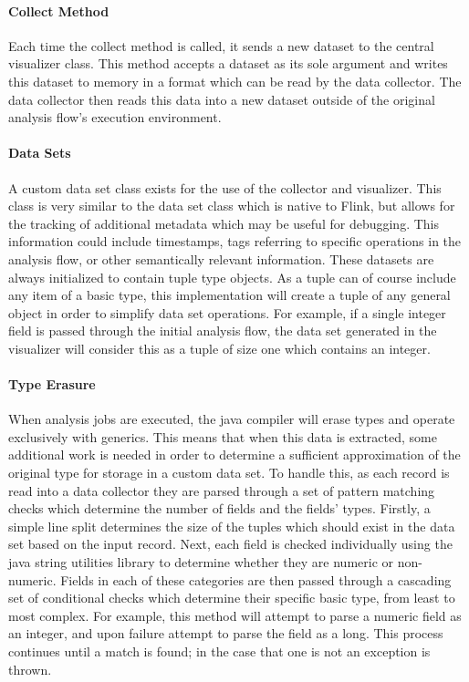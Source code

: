\paragraph{Collect Method}
Each time the collect method is called, it sends a new dataset to the central visualizer class. This method accepts a dataset as its sole argument and writes this dataset to memory in a format which can be read by the data collector. The data collector then reads this data into a new dataset outside of the original analysis flow's execution environment.
  
\paragraph{Data Sets}
A custom data set class exists for the use of the collector and visualizer. This class is very similar to the data set class which is native to Flink, but allows for the tracking of additional metadata which may be useful for debugging. This information could include timestamps, tags referring to specific operations in the analysis flow, or other semantically relevant information. These datasets are always initialized to contain tuple type objects. As a tuple can of course include any item of a basic type, this implementation will create a tuple of any general object in order to simplify data set operations. For example, if a single integer field is passed through the initial analysis flow, the data set generated in the visualizer will consider this as a tuple of size one which contains an integer.

\paragraph{Type Erasure}
When analysis jobs are executed, the java compiler will erase types and operate exclusively with generics. This means that when this data is extracted, some additional work is needed in order to determine a sufficient approximation of the original type for storage in a custom data set. To handle this, as each record is read into a data collector they are parsed through a set of pattern matching checks which determine the number of fields and the fields' types. Firstly, a simple line split determines the size of the tuples which should exist in the data set based on the input record. Next, each field is checked individually using the java string utilities library to determine whether they are numeric or non-numeric. Fields in each of these categories are then passed through a cascading set of conditional checks which determine their specific basic type, from least to most complex. For example, this method will attempt to parse a numeric field as an integer, and upon failure attempt to parse the field as a long. This process continues until a match is found; in the case that one is not an exception is thrown. 

